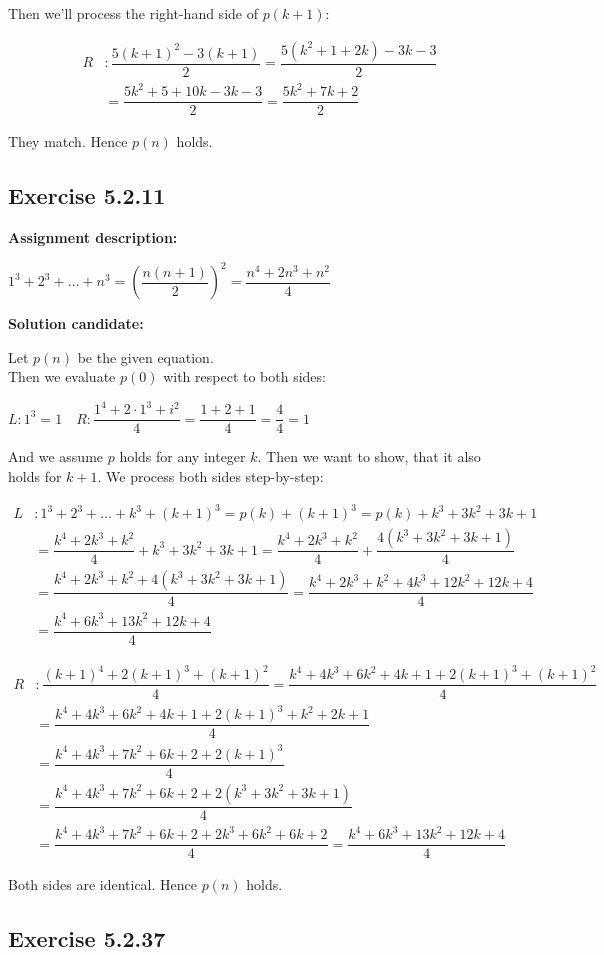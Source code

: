 \documentclass{report}
\newcommand{\cent}[1]{\begin{center}#1\end{center}}
\newcommand{\mAlign}[1]{\begin{align*}#1\end{align*}}
\newcommand{\AssignmentDescription}{\textbf{Assignment description: }}
\newcommand{\Solution}{\textbf{Solution candidate: }}
\newcommand{\QED}{\boxed{}}
\newcommand{\Exercise}[1]{\subsection{Exercise #1}}
\newcommand{\parenthesis}[1]{\left( #1 \right)}
\begin{document}
 	Then we'll process the right-hand side of $p(k+1)$:
 	
 	\mAlign{
 		R &:  \dfrac{5(k+1)^2-3(k+1)}{2} = \dfrac{5(k^2+1+2k)-3k-3}{2}\\
 		&= \dfrac{5k^2+5+10k-3k-3}{2} = \dfrac{5k^2+7k+2}{2}
 	}
 	
 	They match. Hence $p(n)$ holds.\\
 	
 	\QED
 
 	
 	\Exercise{5.2.11}
 	
 	\AssignmentDescription
 	\cent{$1^3+2^3 + \dots + n^3 = \parenthesis{\dfrac{n(n+1)}{2}}^2 =  \dfrac{n^4+2n^3+n^2}{4}$}
 	\Solution
 	
 	Let $p(n)$ be the given equation.\\
 	
 	Then we evaluate $p(0)$ with respect to both sides:
 	
 	\cent{$L : 1^3 = 1 \quad R : \dfrac{1^4+2 \cdot 1^3 + i^2}{4} = \dfrac{1+2+1}{4} = \dfrac{4}{4} = 1$}
 	
 	And we assume $p$ holds for any integer $k$. Then we want to show, that it also holds for $k+1$. We process both sides step-by-step:
 	
 	\mAlign{
 		L &: 1^3+2^3 + \dots + k^3 + (k+1)^3 = p(k) + (k+1)^3 = p(k) + k^3+3k^2 + 3k+1 \\
 		&= \dfrac{k^4+2k^3+k^2}{4} + k^3+3k^2 + 3k+1 = \dfrac{k^4+2k^3+k^2}{4} + \dfrac{4(k^3+3k^2 + 3k+1)}{4} \\
 		&= \dfrac{k^4+2k^3+k^2 + 4(k^3+3k^2 + 3k+1)}{4} = \dfrac{k^4+2k^3+k^2 + 4k^3 + 12k^2+12k+4}{4} \\
 		&= \dfrac{k^4+6k^3 + 13k^2+12k+4}{4}
 	}
 	
 	\mAlign{
 		R &: \dfrac{(k+1)^4+2(k+1)^3+(k+1)^2}{4} = \dfrac{k^4 +4 k^3 + 6k^2+ 4k + 1+2(k+1)^3+(k+1)^2}{4} \\
 		&= \dfrac{k^4 +4 k^3 + 6k^2+ 4k + 1+2(k+1)^3+k^2+2k+1}{4} \\
 		&= \dfrac{k^4 +4 k^3 + 7k^2+ 6k + 2+2(k+1)^3}{4} \\
 		&= \dfrac{k^4 +4 k^3 + 7k^2+ 6k + 2+ 2 (k^3+3k^2 + 3k + 1)}{4} \\
 		&= \dfrac{k^4 +4 k^3 + 7k^2+ 6k + 2 + 2k^3 +6k^2+6k+2}{4} = \dfrac{k^4 +6 k^3 + 13k^2+ 12k + 4}{4}
 	}
 
 	Both sides are identical. Hence $p(n)$ holds.\\
 	
 	\QED
 	
 	\Exercise{5.2.37}
 	
\end{document}
